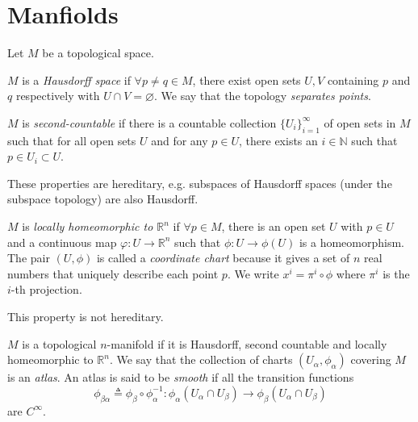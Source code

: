 \section{Manfiolds}

Let $M$ be a topological space.
\begin{defn}
$M$ is a \emph{Hausdorff space} if $\forall p \neq q \in M$,
there exist open sets $U, V$ containing $p$ and $q$ respectively
with $U \cap V = \varnothing$. We say that the topology
\emph{separates points}.
\end{defn}

\begin{defn}
$M$ is \emph{second-countable} if there is a countable collection
$\{U_i\}_{i=1}^\infty$ of open sets in $M$ such that for all open sets
$U$ and for any $p \in U$, there exists an $i \in \mathbb{N}$ such
that
$p \in U_i \subset U$.
\end{defn}

These properties are hereditary, e.g. subspaces of Hausdorff spaces (under the subspace
topology) are also Hausdorff.

\begin{defn}
$M$ is \emph{locally homeomorphic to $\mathbb{R}^n$} if
$\forall p \in M$, there is an open set $U$ with $p \in U$ and a
continuous map $\varphi: U \to \mathbb{R}^n$ such that
$\phi: U \to \phi(U)$ is a homeomorphism. The pair $(U, \phi)$ is
called a \emph{coordinate chart} because it gives a set of $n$ real numbers
that uniquely describe each point $p$. We write $x^i = \pi^i \circ
\phi$ where $\pi^i$ is the $i$-th projection.
\end{defn}
This property is not hereditary.

\begin{defn}
$M$ is a topological $n$-manifold if it is Hausdorff, second countable
and locally homeomorphic to $\mathbb{R}^n$. We say that the collection
of charts $(U_\alpha, \phi_\alpha)$ covering $M$ is an
\emph{atlas}. An atlas is said to be \emph{smooth} if all the
transition functions
$$
  \phi_{\beta\alpha}
\triangleq
  \phi_\beta \circ \phi_\alpha^{-1}
:   \phi_\alpha(U_\alpha \cap  U_\beta)
\to \phi_\beta(U_\alpha \cap U_\beta)
$$
are $C^\infty$.
\end{defn}

